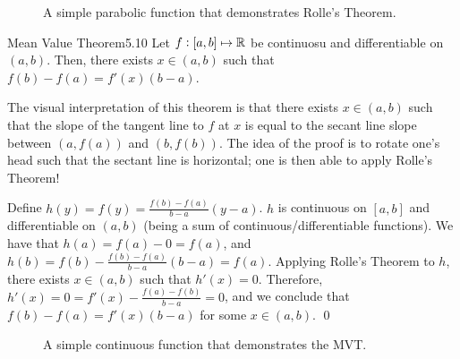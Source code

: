 \begin{figure}[htbp]
    \centering
    
    \caption{A simple parabolic function that demonstrates Rolle's Theorem.}
    \label{fig21}
\end{figure}

\setcounter{rudin}{9}
\begin{theorem}{Mean Value Theorem}{5.10}
    Let $f: [a, b] \mapsto \mathbb{R}$ be continuosu and differentiable on $(a, b)$. Then, there exists $x \in (a, b)$ such that $f(b) - f(a) = f'(x)(b - a)$.
\end{theorem}
\noindent The visual interpretation of this theorem is that there exists $x \in (a, b)$ such that the slope of the tangent line to $f$ at $x$ is equal to the secant line slope between $(a, f(a))$ and $(b, f(b))$. The idea of the proof is to rotate one's head such that the sectant line is horizontal; one is then able to apply Rolle's Theorem!

\begin{nproof}
    Define $h(y) = f(y) = \frac{f(b) - f(a)}{b - a}(y - a)$. $h$ is continuous on $[a, b]$ and differentiable on $(a, b)$ (being a sum of continuous/differentiable functions). We have that $h(a) = f(a) - 0 = f(a)$, and $h(b) = f(b) - \frac{f(b) - f(a)}{b - a}(b - a) = f(a)$. Applying Rolle's Theorem to $h$, there exists $x \in (a, b)$ such that $h'(x) = 0$. Therefore, $h'(x) = 0 = f'(x) - \frac{f(a) - f(b)}{b - a} = 0$, and we conclude that $f(b) - f(a) = f'(x)(b - a)$ for some $x \in (a, b)$. \qed
\end{nproof}

\begin{figure}[htbp]
    \centering
    \caption{A simple continuous function that demonstrates the MVT.}
    \label{fig22}
\end{figure}


